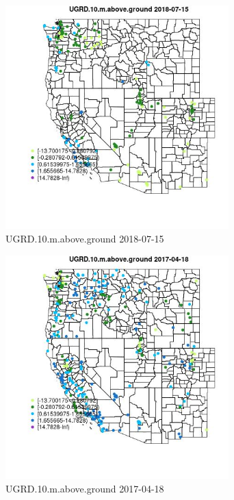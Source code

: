 \begin{figure} 
\centering  
\includegraphics[width=0.77\textwidth]{Code_Outputs/Report_ML_input_PM25_Step4_part_e_de_duplicated_aves_compiled_2019-05-20wNAs_MapObsUGRD10maboveground2018-07-15.jpg} 
\caption{\label{fig:Report_ML_input_PM25_Step4_part_e_de_duplicated_aves_compiled_2019-05-20wNAsMapObsUGRD10maboveground2018-07-15}UGRD.10.m.above.ground 2018-07-15} 
\end{figure} 
 

\begin{figure} 
\centering  
\includegraphics[width=0.77\textwidth]{Code_Outputs/Report_ML_input_PM25_Step4_part_e_de_duplicated_aves_compiled_2019-05-20wNAs_MapObsUGRD10maboveground2017-04-18.jpg} 
\caption{\label{fig:Report_ML_input_PM25_Step4_part_e_de_duplicated_aves_compiled_2019-05-20wNAsMapObsUGRD10maboveground2017-04-18}UGRD.10.m.above.ground 2017-04-18} 
\end{figure} 
 

